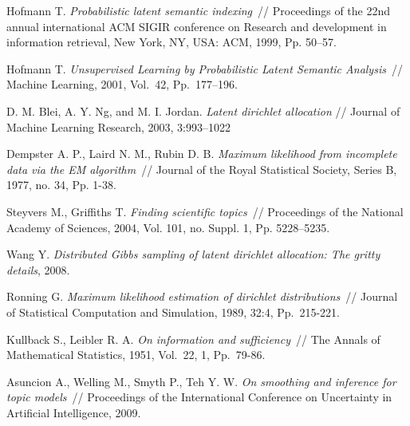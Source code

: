 \begin{thebibliography}{99}

 Hofmann T. \textit{Probabilistic latent semantic indexing}~// Proceedings of the 22nd annual international ACM SIGIR conference on Research and development in information retrieval, New York, NY, USA: ACM, 1999, Pp. 50–57.

 Hofmann T.	\textit{Unsupervised Learning by Probabilistic Latent Semantic Analysis}~// Machine Learning, 2001, Vol.~42, Pp.~177--196.

  D. M. Blei, A. Y. Ng, and M. I. Jordan. \textit{Latent dirichlet allocation} // Journal of Machine Learning Research, 2003, 3:993–1022

 Dempster A. P., Laird N. M., Rubin D. B. \textit{Maximum likelihood from incomplete data via the EM algorithm}~// Journal of the Royal Statistical Society, Series B, 1977, no. 34, Pp. 1-38.

 Steyvers M., Griffiths T. \textit{Finding scientific topics}~// Proceedings of the National
Academy of Sciences, 2004, Vol. 101, no. Suppl. 1, Pp. 5228–5235.

 Wang Y.  \textit{Distributed Gibbs sampling of latent dirichlet allocation: The gritty
details}, 2008.

 Ronning G. \textit{Maximum likelihood estimation of dirichlet distributions}~// Journal of Statistical Computation and Simulation, 1989, 32:4, Pp.~215-221.

 Kullback S., Leibler R. A.  \textit{On information and sufficiency}~// The Annals of Mathematical Statistics, 1951, Vol.~22, 1, Pp.~79-86.

 Asuncion A., Welling M., Smyth P., Teh Y. W. \textit{On smoothing and inference for topic models}~// Proceedings of the International Conference on Uncertainty in Artificial Intelligence, 2009.
\end{thebibliography}